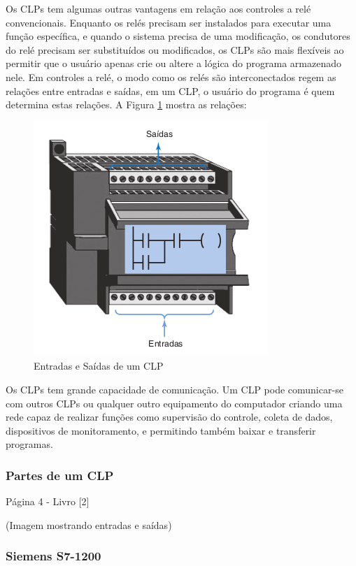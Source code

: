 \documentclass[a4paper, 12pt]{article}
\begin{document}
		Os CLPs tem algumas outras vantagens em relação aos controles a relé convencionais. Enquanto os relés
		precisam ser instalados para executar uma função específica, e quando o sistema precisa de uma modificação,
		os condutores do relé precisam ser substituídos ou modificados, os CLPs são mais flexíveis ao permitir
		que o usuário apenas crie ou altere a lógica do programa armazenado nele.
		Em controles a relé, o modo como os relés são interconectados regem as relações entre	entradas e saídas,
		em um CLP, o usuário do programa é quem determina estas relações. A Figura \ref{fig:clp-io-relation} mostra as relações:
	
		\begin{figure}[H]
			\centering
			\includegraphics[scale=0.5]{figures/CLPInputOutputRelation.png}
			\caption{Entradas e Saídas de um CLP}
			\label{fig:clp-io-relation}
		\end{figure}
	
		Os CLPs tem grande capacidade de comunicação. Um CLP pode comunicar-se com outros CLPs ou qualquer outro
		equipamento do computador criando uma rede capaz de realizar funções como supervisão do controle, coleta de dados,
		dispositivos de monitoramento, e permitindo também baixar e transferir programas.
	
		\subsubsection{Partes de um CLP}
			Página 4 - Livro [2]
		
			(Imagem mostrando entradas e saídas)
	
		\subsubsection{Siemens S7-1200}
		
\end{document}
